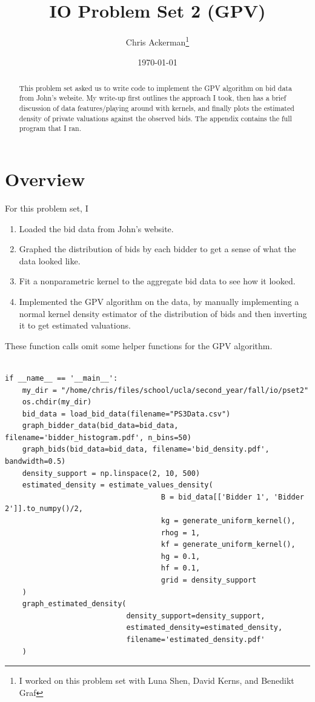 \documentclass[dvipsnames]{article}
\title{IO Problem Set 2 (GPV)}
\author{Chris Ackerman\thanks{I worked on this problem set with Luna Shen, David Kerns, and Benedikt Graf}}
\date{\today}
\begin{document}
\maketitle
\begin{abstract}
  This problem set asked us to write code to implement the GPV algorithm on bid data from John's website. My write-up first outlines the approach I took, then has a brief discussion of data features/playing around with kernels, and finally plots the estimated density of private valuations against the observed bids. The appendix contains the full program that I ran.
\end{abstract}
\section{Overview}
For this problem set, I
\begin{enumerate}
\item Loaded the bid data from John's website.
\item Graphed the distribution of bids by each bidder to get a sense of what the data looked like.
\item Fit a nonparametric kernel to the aggregate bid data to see how it looked.
  \item Implemented the GPV algorithm on the data, by manually implementing a normal kernel density estimator of the distribution of bids and then inverting it to get estimated valuations.
\end{enumerate}
These function calls omit some helper functions for the GPV algorithm.
\begin{verbatim}
    
if __name__ == '__main__':
    my_dir = "/home/chris/files/school/ucla/second_year/fall/io/pset2"
    os.chdir(my_dir)
    bid_data = load_bid_data(filename="PS3Data.csv")
    graph_bidder_data(bid_data=bid_data, filename='bidder_histogram.pdf', n_bins=50)
    graph_bids(bid_data=bid_data, filename='bid_density.pdf', bandwidth=0.5)
    density_support = np.linspace(2, 10, 500)
    estimated_density = estimate_values_density(
                                    B = bid_data[['Bidder 1', 'Bidder 2']].to_numpy()/2,
                                    kg = generate_uniform_kernel(),
                                    rhog = 1,
                                    kf = generate_uniform_kernel(),
                                    hg = 0.1,
                                    hf = 0.1,
                                    grid = density_support
    )
    graph_estimated_density(
                            density_support=density_support,
                            estimated_density=estimated_density,
                            filename='estimated_density.pdf'
    )
  \end{verbatim}
\end{document}

